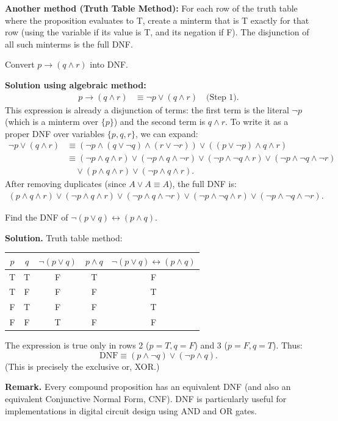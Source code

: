 \documentclass[11pt,a4paper]{article}
\begin{document}
\textbf{Another method (Truth Table Method):} For each row of the truth table where the proposition evaluates to T, create a minterm that is T exactly for that row (using the variable if its value is T, and its negation if F). The disjunction of all such minterms is the full DNF.

\begin{example}
Convert $p \to (q \land r)$ into DNF.

\textbf{Solution using algebraic method:}
\begin{align*}
    p \to (q \land r) &\equiv \neg p \lor (q \land r) \quad \text{(Step 1)}.
\end{align*}
This expression is already a disjunction of terms: the first term is the literal $\neg p$ (which is a minterm over $\{p\}$) and the second term is $q \land r$. To write it as a proper DNF over variables $\{p,q,r\}$, we can expand:
\begin{align*}
    \neg p \lor (q \land r) &\equiv (\neg p \land (q \lor \neg q) \land (r \lor \neg r)) \lor ((p \lor \neg p) \land q \land r) \\
    &\equiv (\neg p \land q \land r) \lor (\neg p \land q \land \neg r) \lor (\neg p \land \neg q \land r) \lor (\neg p \land \neg q \land \neg r) \\
    &\quad \lor (p \land q \land r) \lor (\neg p \land q \land r).
\end{align*}
After removing duplicates (since $A \lor A \equiv A$), the full DNF is:
\begin{align*}
    (p \land q \land r) \lor (\neg p \land q \land r) \lor (\neg p \land q \land \neg r) \lor (\neg p \land \neg q \land r) \lor (\neg p \land \neg q \land \neg r).
\end{align*}
\end{example}

\begin{example}
Find the DNF of $\neg(p \lor q) \leftrightarrow (p \land q)$.

\textbf{Solution.} Truth table method:
\begin{center}
\begin{tabular}{|c|c|c|c|c|}
\hline
$p$ & $q$ & $\neg(p \lor q)$ & $p \land q$ & $\neg(p \lor q) \leftrightarrow (p \land q)$ \\
\hline
T & T & F & T & F \\
T & F & F & F & T \\
F & T & F & F & T \\
F & F & T & F & F \\
\hline
\end{tabular}
\end{center}
The expression is true only in rows 2 ($p=T, q=F$) and 3 ($p=F, q=T$). Thus:
\begin{equation*}
    \text{DNF} \equiv (p \land \neg q) \lor (\neg p \land q).
\end{equation*}
(This is precisely the exclusive or, XOR.)
\end{example}

\textbf{Remark.} Every compound proposition has an equivalent DNF (and also an equivalent Conjunctive Normal Form, CNF). DNF is particularly useful for implementations in digital circuit design using AND and OR gates.
\end{document}
